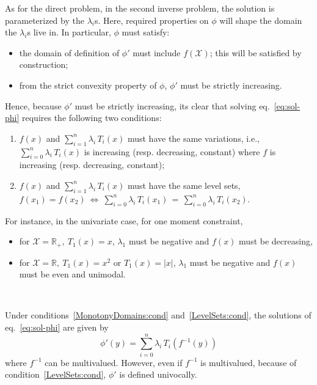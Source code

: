\documentclass[entropy,article,submit,moreauthors,pdftex]{Definitions/mdpi}
\newcommand{\SZ}[1]{{\color{blue} #1}}                                       %
\def\Rset{\mathbb{R}}%
\def\X{\mathcal{X}}%
\begin{document}
As  for the  direct problem,  in  the second  inverse problem,  the solution  is
parameterized  by the  $\lambda_i$s. Here,  required properties  on $\phi$  will
shape the domain the $\lambda_i$s live in. In particular, $\phi$ must satisfy:
%
\begin{itemize}
\item the  domain of definition  of $\phi'$ must  include $f(\X)$; this  will be
  satisfied by construction;
%
\item from  the strict convexity  property of  $\phi$, $\phi'$ must  be strictly
  increasing.
\end{itemize}
%
Hence,  because $\phi'$  must  be  strictly increasing,  its  clear that  solving
eq.~\eqref{eq:sol-phi} requires the following two conditions:
%
\begin{enumerate}[label=(C\arabic*)]
\item\label{MonotonyDomains:cond}   $f(x)$   and   $\displaystyle   \sum_{i=1}^n
  \lambda_i  \, T_i(x)$  must  have the  same  variations, i.e.,  $\displaystyle
  \sum_{i=0}^n \lambda_i \, T_i(x)$  is increasing (resp.  decreasing, constant)
  where $f$ is increasing (resp. decreasing, constant);
%
\item\label{LevelSets:cond} $f(x)$ and  $\displaystyle \sum_{i=1}^n \lambda_i \,
  T_i(x)$ must have the same level sets,\newline $ \displaystyle f(x_1) = f(x_2)
  \: \Leftrightarrow \: \sum_{i=0}^n \lambda_i  \, T_i(x_1) \, = \, \sum_{i=0}^n
  \lambda_i \, T_i(x_2)$.
\end{enumerate}
%
For instance, in the univariate case, for one moment constraint,
%
\begin{itemize}
\item for $\X = \Rset_+, \: T_1(x) = x$, $\lambda_1$ must be negative and $f(x)$
  must be decreasing,
%
\item for $\X =  \Rset, \: T_1(x) = x^2$ or $T_1(x) =  |x|$, $\lambda_1$ must be
  negative and $f(x)$ must be even and unimodal.
\end{itemize}

\

Under   conditions~\ref{MonotonyDomains:cond}    and~\ref{LevelSets:cond},   the
solutions of eq.~\eqref{eq:sol-phi} are given by
%
\begin{equation}\label{eq:derivative-phi}
\phi'(y) = \sum_{i=0}^n \lambda_i \, T_i\!\left(f^{-1}(y)\right)
\end{equation}
%
where $f^{-1}$ can be multivalued. \SZ{However, even if $f^{-1}$ is multivalued,
  because of condition~\ref{LevelSets:cond}, $\phi'$ is defined univocally.}
\end{document}
